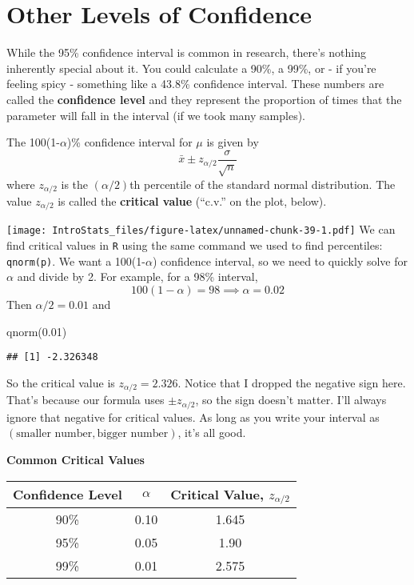 \documentclass[
]{book}
\newenvironment{Shaded}{\begin{snugshade}}{\end{snugshade}}
\newcommand{\FloatTok}[1]{\textcolor[rgb]{0.00,0.00,0.81}{#1}}
\newcommand{\FunctionTok}[1]{\textcolor[rgb]{0.00,0.00,0.00}{#1}}
\newcommand{\NormalTok}[1]{#1}
\begin{document}
\hypertarget{other-levels-of-confidence}{%
\section{Other Levels of Confidence}\label{other-levels-of-confidence}}

While the 95\% confidence interval is common in research, there's nothing inherently special about it. You could calculate a 90\%, a 99\%, or - if you're feeling spicy - something like a 43.8\% confidence interval. These numbers are called the \textbf{confidence level} and they represent the proportion of times that the parameter will fall in the interval (if we took many samples).

The 100(1-\(\alpha\))\% confidence interval for \(\mu\) is given by \[\bar{x}\pm z_{\alpha/2}\frac{\sigma}{\sqrt{n}}\] where \(z_{\alpha/2}\) is the \((\alpha/2)\)th percentile of the standard normal distribution. The value \(z_{\alpha/2}\) is called the \textbf{critical value} (``c.v.'' on the plot, below).

\texttt{[image: IntroStats\_files/figure-latex/unnamed-chunk-39-1.pdf]}
We can find critical values in \texttt{R} using the same command we used to find percentiles: \texttt{qnorm(p)}. We want a 100(1-\(\alpha\)) confidence interval, so we need to quickly solve for \(\alpha\) and divide by 2. For example, for a 98\% interval, \[100(1-\alpha) = 98 \implies \alpha=0.02\] Then \(\alpha/2 = 0.01\) and

\begin{Shaded}
\begin{Highlighting}[]
\FunctionTok{qnorm}\NormalTok{(}\FloatTok{0.01}\NormalTok{)}
\end{Highlighting}
\end{Shaded}

\begin{verbatim}
## [1] -2.326348
\end{verbatim}

So the critical value is \(z_{\alpha/2}=2.326\). Notice that I dropped the negative sign here. That's because our formula uses \(\pm z_{\alpha/2}\), so the sign doesn't matter. I'll always ignore that negative for critical values. As long as you write your interval as \((\text{smaller number}, \text{bigger number})\), it's all good.

\textbf{Common Critical Values}

\begin{longtable}[]{@{}ccc@{}}
\toprule
Confidence Level & \(\alpha\) & Critical Value, \(z_{\alpha/2}\) \\
\midrule
\endhead
90\% & 0.10 & 1.645 \\
95\% & 0.05 & 1.90 \\
99\% & 0.01 & 2.575 \\
\bottomrule
\end{longtable}
\end{document}
